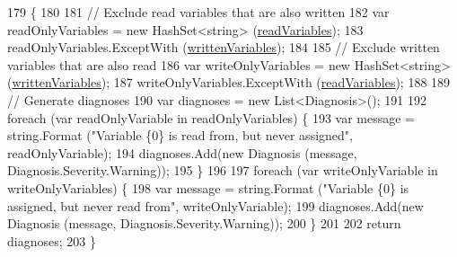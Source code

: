 \begin{DoxyCode}
179         \{
180 
181             \textcolor{comment}{// Exclude read variables that are also written}
182             var readOnlyVariables = \textcolor{keyword}{new} HashSet<string> (\hyperlink{a00098_a6b542092ddce1b92c9455d60899518a9}{readVariables});
183             readOnlyVariables.ExceptWith (\hyperlink{a00098_a0c2fe6eded1b10b135ca2469f5980a39}{writtenVariables});
184 
185             \textcolor{comment}{// Exclude written variables that are also read}
186             var writeOnlyVariables = \textcolor{keyword}{new} HashSet<string> (\hyperlink{a00098_a0c2fe6eded1b10b135ca2469f5980a39}{writtenVariables});
187             writeOnlyVariables.ExceptWith (\hyperlink{a00098_a6b542092ddce1b92c9455d60899518a9}{readVariables});
188 
189             \textcolor{comment}{// Generate diagnoses}
190             var diagnoses = \textcolor{keyword}{new} List<Diagnosis>();
191 
192             \textcolor{keywordflow}{foreach} (var readOnlyVariable \textcolor{keywordflow}{in} readOnlyVariables) \{
193                 var message = string.Format (\textcolor{stringliteral}{"Variable \{0\} is read from, but never assigned"}, 
      readOnlyVariable);
194                 diagnoses.Add(\textcolor{keyword}{new} Diagnosis (message, Diagnosis.Severity.Warning));
195             \}
196 
197             \textcolor{keywordflow}{foreach} (var writeOnlyVariable \textcolor{keywordflow}{in} writeOnlyVariables) \{
198                 var message = string.Format (\textcolor{stringliteral}{"Variable \{0\} is assigned, but never read from"}, 
      writeOnlyVariable);
199                 diagnoses.Add(\textcolor{keyword}{new} Diagnosis (message, Diagnosis.Severity.Warning));
200             \}
201 
202             \textcolor{keywordflow}{return} diagnoses;
203         \}
\end{DoxyCode}


